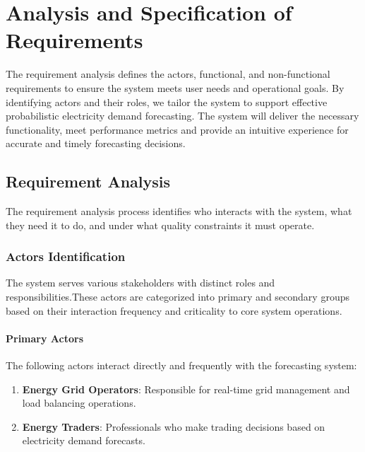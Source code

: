 \chapter{Analysis and Specification of Requirements}
\label{chap:requirements}

The requirement analysis defines the actors, functional, and non-functional
requirements to ensure the system meets user needs and operational goals.
By identifying actors and their roles, we tailor the system to support
effective probabilistic electricity demand forecasting. The system will
deliver the necessary functionality, meet performance metrics and provide an intuitive experience for accurate and timely forecasting decisions.

\section{Requirement Analysis}
\label{sec:req_analysis}

The requirement analysis process identifies who interacts with the system,
what they need it to do, and under what quality constraints it must operate.

\subsection{Actors Identification}
\label{subsec:actors}

The system serves various stakeholders with distinct roles and responsibilities.These actors are categorized into primary and secondary groups based on their interaction frequency and criticality to core system operations.

\subsubsection{Primary Actors}

The following actors interact directly and frequently with the forecasting system:

\begin{enumerate}
    \item \textbf{Energy Grid Operators}: Responsible for real-time grid management and load balancing operations.
    
    \item \textbf{Energy Traders}: Professionals who make trading decisions based on electricity demand forecasts.

\end{enumerate}

